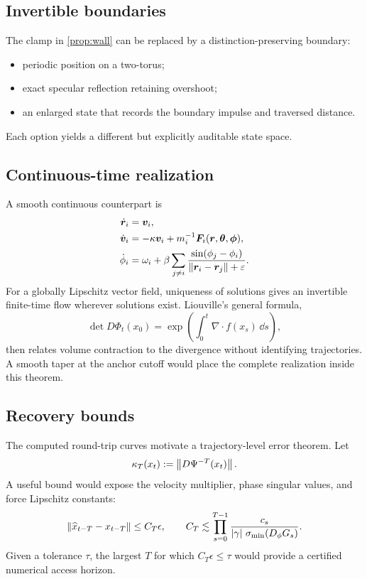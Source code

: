 \subsection{Invertible boundaries}

The clamp in \cref{prop:wall} can be replaced by a distinction-preserving boundary:
\begin{itemize}
\item periodic position on a two-torus;
\item exact specular reflection retaining overshoot;
\item an enlarged state that records the boundary impulse and traversed distance.
\end{itemize}
Each option yields a different but explicitly auditable state space.

\subsection{Continuous-time realization}

A smooth continuous counterpart is
\begin{subequations}
\begin{align}
\dot{\bm r}_i&=\bm v_i,\\
\dot{\bm v}_i&=-\kappa\bm v_i+m_i^{-1}\bm F_i(\bm r,\bm\theta,\bm\phi),\\
\dot\phi_i&=\omega_i+\beta\sum_{j\neq i}
\frac{\sin(\phi_j-\phi_i)}
{\left\lVert \bm r_i-\bm r_j\right\rVert+\varepsilon}.
\end{align}
\label{eq:continuous}
\end{subequations}
For a globally Lipschitz vector field, uniqueness of solutions gives an invertible finite-time flow wherever solutions exist. Liouville's general formula,
\[
\det D\Phi_t(x_0)
=
\exp\left(
\int_0^t\nabla\cdot f(x_s)\,\dd s
\right),
\]
then relates volume contraction to the divergence without identifying trajectories. A smooth taper at the anchor cutoff would place the complete realization inside this theorem.

\subsection{Recovery bounds}

The computed round-trip curves motivate a trajectory-level error theorem. Let
\[
\kappa_T(x_t):=\left\lVert D\Psi^{-T}(x_t)\right\rVert.
\]
A useful bound would expose the velocity multiplier, phase singular values, and force Lipschitz constants:
\begin{equation}
\left\lVert \widehat x_{t-T}-x_{t-T}\right\rVert
\le
C_T\epsilon,
\qquad
C_T
\lesssim
\prod_{s=0}^{T-1}
\frac{c_s}
{\left\lvert \gamma\right\rvert\,\sigma_{\min}(D_\phi G_s)}.
\label{eq:horizon-bound}
\end{equation}
Given a tolerance \(\tau\), the largest \(T\) for which \(C_T\epsilon\le\tau\) would provide a certified numerical access horizon.

